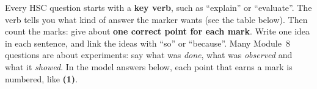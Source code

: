 
\newcommand\ansPt[1]{\textcolor{hscbrand}{\bfseries(#1)}}

Every HSC question starts with a \textbf{key verb}, such as ``explain'' or ``evaluate''.
The verb tells you what kind of answer the marker wants (see the table below). Then count
the marks: give about \textbf{one correct point for each mark}. Write one idea in each
sentence, and link the ideas with ``so'' or ``because''. Many Module~8 questions are about
experiments: say what was \emph{done}, what was \emph{observed} and what it \emph{showed}.
In the model answers below, each point that earns a mark is numbered, like \ansPt{1}.

